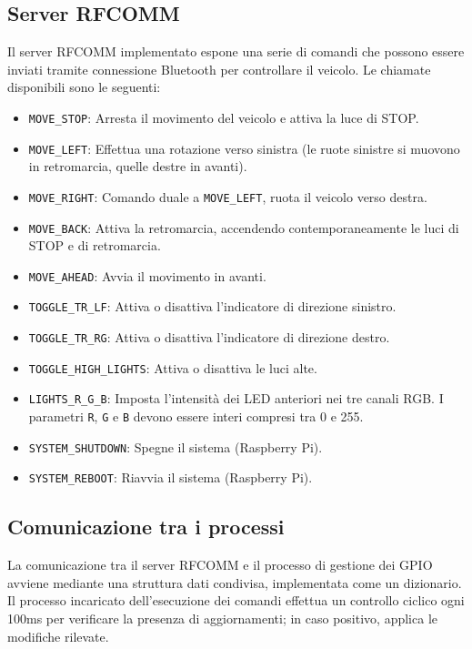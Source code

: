 \documentclass{article}
\begin{document}
\subsection{Server RFCOMM}

Il server RFCOMM implementato espone una serie di comandi che possono essere inviati tramite connessione Bluetooth per controllare il veicolo. Le chiamate disponibili sono le seguenti:

\begin{itemize}
    \item \texttt{MOVE\_STOP}: Arresta il movimento del veicolo e attiva la luce di STOP.
    \item \texttt{MOVE\_LEFT}: Effettua una rotazione verso sinistra (le ruote sinistre si muovono in retromarcia, quelle destre in avanti).
    \item \texttt{MOVE\_RIGHT}: Comando duale a \texttt{MOVE\_LEFT}, ruota il veicolo verso destra.
    \item \texttt{MOVE\_BACK}: Attiva la retromarcia, accendendo contemporaneamente le luci di STOP e di retromarcia.
    \item \texttt{MOVE\_AHEAD}: Avvia il movimento in avanti.
    \item \texttt{TOGGLE\_TR\_LF}: Attiva o disattiva l'indicatore di direzione sinistro.
    \item \texttt{TOGGLE\_TR\_RG}: Attiva o disattiva l'indicatore di direzione destro.
    \item \texttt{TOGGLE\_HIGH\_LIGHTS}: Attiva o disattiva le luci alte.
    \item \texttt{LIGHTS\_R\_G\_B}: Imposta l'intensità dei LED anteriori nei tre canali RGB. I parametri \texttt{R}, \texttt{G} e \texttt{B} devono essere interi compresi tra 0 e 255.
    \item \texttt{SYSTEM\_SHUTDOWN}: Spegne il sistema (Raspberry Pi).
    \item \texttt{SYSTEM\_REBOOT}: Riavvia il sistema (Raspberry Pi).
\end{itemize}

\subsection{Comunicazione tra i processi}

La comunicazione tra il server RFCOMM e il processo di gestione dei GPIO avviene mediante una struttura dati condivisa, implementata come un dizionario. Il processo incaricato dell’esecuzione dei comandi effettua un controllo ciclico ogni 100ms per verificare la presenza di aggiornamenti; in caso positivo, applica le modifiche rilevate.
\end{document}
